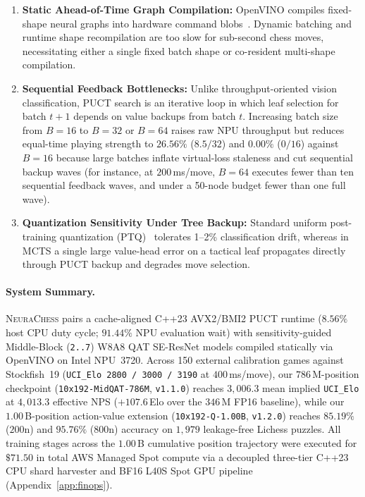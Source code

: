 \documentclass[10pt,twocolumn]{article}
\begin{document}
\begin{enumerate}
  \item \textbf{Static Ahead-of-Time Graph Compilation:} OpenVINO compiles fixed-shape neural graphs into hardware command blobs~\cite{openvino2024}. Dynamic batching and runtime shape recompilation are too slow for sub-second chess moves, necessitating either a single fixed batch shape or co-resident multi-shape compilation.
  \item \textbf{Sequential Feedback Bottlenecks:} Unlike throughput-oriented vision classification, PUCT search is an iterative loop in which leaf selection for batch $t+1$ depends on value backups from batch $t$. Increasing batch size from $B=16$ to $B=32$ or $B=64$ raises raw NPU throughput but reduces equal-time playing strength to $26.56\%$ ($8.5/32$) and $0.00\%$ ($0/16$) against $B=16$ because large batches inflate virtual-loss staleness and cut sequential backup waves (for instance, at $200$\,ms/move, $B=64$ executes fewer than ten sequential feedback waves, and under a 50-node budget fewer than one full wave).
  \item \textbf{Quantization Sensitivity Under Tree Backup:} Standard uniform post-training quantization (PTQ)~\cite{nagel2021whitepaper} tolerates 1--2\% classification drift, whereas in MCTS a single large value-head error on a tactical leaf propagates directly through PUCT backup and degrades move selection.
\end{enumerate}

\paragraph{System Summary.}
\textsc{NeuraChess} pairs a cache-aligned C++23 AVX2/BMI2 PUCT runtime ($8.56\%$ host CPU duty cycle; $91.44\%$ NPU evaluation wait) with sensitivity-guided Middle-Block (\texttt{2..7}) W8A8 QAT SE-ResNet models compiled statically via OpenVINO on Intel NPU~3720. Across 150 external calibration games against Stockfish~19 (\texttt{UCI\_Elo 2800 / 3000 / 3190} at $400$\,ms/move), our $786$\,M-position checkpoint (\texttt{10x192-MidQAT-786M}, \texttt{v1.1.0}) reaches $3{,}006.3$ mean implied \texttt{UCI\_Elo} at $4{,}013.3$ effective NPS ($+107.6$\,Elo over the $346$\,M FP16 baseline), while our $1.00$\,B-position action-value extension (\texttt{10x192-Q-1.00B}, \texttt{v1.2.0}) reaches $85.19\%$ ($200\text{n}$) and $95.76\%$ ($800\text{n}$) accuracy on $1{,}979$ leakage-free Lichess puzzles. All training stages across the $1.00$\,B cumulative position trajectory were executed for $\$71.50$ in total AWS Managed Spot compute via a decoupled three-tier C++23 CPU shard harvester and BF16 L40S Spot GPU pipeline (Appendix~\ref{app:finops}).
\end{document}
